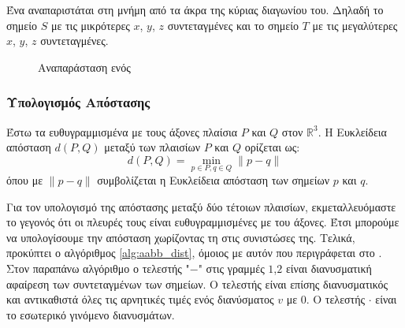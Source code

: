 Ένα  αναπαριστάται στη μνήμη από τα άκρα της κύριας 
διαγωνίου του.
Δηλαδή το σημείο $S$ με τις μικρότερες $x$, $y$, $z$ συντεταγμένες
και το σημείο $T$ με τις μεγαλύτερες $x$, $y$, $z$ συντεταγμένες.

\begin{figure}[h]
    \centering
    
    \newcommand{\Depth}{2}
    \newcommand{\Height}{2}
    \newcommand{\Width}{3}
    \caption[Αναπαράσταση ενός ]{Αναπαράσταση ενός }
\end{figure}

\subsubsection{Υπολογισμός Απόστασης }
Έστω τα ευθυγραμμισμένα με τους άξονες πλαίσια
$P$ και $Q$ στον $\mathbb{R}^3$.
Η Ευκλείδεια απόσταση $d(P,Q)$ μεταξύ των πλαισίων $P$ και $Q$
ορίζεται ως:
\[ d(P,Q) = \min_{p \in P, q \in Q} \lVert p - q \rVert \]
όπου με $\lVert p - q \rVert$ συμβολίζεται η Ευκλείδεια 
απόσταση των σημείων $p$ και $q$.

Για τον υπολογισμό της απόστασης μεταξύ δύο τέτοιων πλαισίων, 
εκμεταλλευόμαστε το γεγονός ότι οι πλευρές τους είναι ευθυγραμμισμένες
με του άξονες.
Έτσι μπορούμε να υπολογίσουμε την απόσταση χωρίζοντας τη στις συνιστώσες της.
Τελικά, προκύπτει ο αλγόριθμος \ref{alg:aabb_dist}, 
όμοιος με αυτόν που περιγράφεται στο \cite{krishnamurthy2011gpu}.
Στον παραπάνω αλγόριθμο  ο τελεστής "$-$" στις γραμμές 
$1$,$2$ είναι διανυσματική αφαίρεση των συντεταγμένων των σημείων.
Ο τελεστής  είναι επίσης διανυσματικός και
αντικαθιστά όλες τις αρνητικές τιμές ενός διανύσματος $v$
με $0$.
Ο τελεστής $\cdot$ είναι το εσωτερικό γινόμενο διανυσμάτων.

